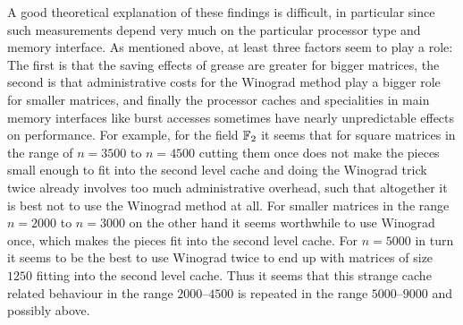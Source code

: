 A good theoretical explanation of these findings is difficult, in
particular since such measurements depend very much on the particular
processor type and memory interface. As mentioned above, at least
three factors
seem to play a role: The first is that the saving effects of grease
are greater for bigger matrices, the second is that administrative
costs for the Winograd method play a bigger role for smaller matrices,
and finally the processor caches and specialities in main memory
interfaces like burst accesses sometimes have nearly unpredictable
effects on performance. For example, for the field $\mathbb{F}_2$ it seems that
for square matrices in the range of $n=3500$ to $n=4500$ cutting them
once does not make the pieces small enough to fit into the second
level cache and doing the Winograd trick twice already involves
too much administrative overhead, such that altogether it is best not
to use the Winograd method at all. For smaller matrices in the range $n=2000$
to $n=3000$ on the other hand it seems worthwhile to use Winograd once,
which makes the pieces fit into the second level cache. For $n=5000$ in
turn it seems to be the best to use Winograd twice to end up with
matrices of size $1250$ fitting into the second level cache. Thus it
seems that this strange cache related behaviour in the range 
$2000$--$4500$ is repeated in the range $5000$--$9000$ and possibly
above.


